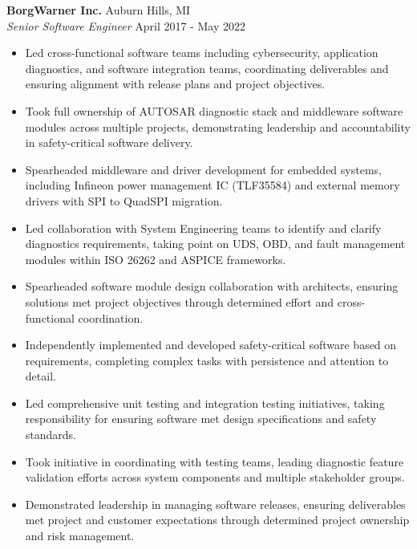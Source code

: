 \vspace{0.75em}

\noindent
\textbf{BorgWarner Inc.} \hfill Auburn Hills, MI \\
\textit{Senior Software Engineer} \hfill April 2017 - May 2022 \\
\begin{itemize}[leftmargin=*,noitemsep,topsep=3pt]
    \item Led cross-functional software teams including cybersecurity, application diagnostics, and software integration teams, coordinating deliverables and ensuring alignment with release plans and project objectives.
    \item Took full ownership of AUTOSAR diagnostic stack and middleware software modules across multiple projects, demonstrating leadership and accountability in safety-critical software delivery.
    \item Spearheaded middleware and driver development for embedded systems, including Infineon power management IC (TLF35584) and external memory drivers with SPI to QuadSPI migration.
    \item Led collaboration with System Engineering teams to identify and clarify diagnostics requirements, taking point on UDS, OBD, and fault management modules within ISO 26262 and ASPICE frameworks.
    \item Spearheaded software module design collaboration with architects, ensuring solutions met project objectives through determined effort and cross-functional coordination.
    \item Independently implemented and developed safety-critical software based on requirements, completing complex tasks with persistence and attention to detail.
    \item Led comprehensive unit testing and integration testing initiatives, taking responsibility for ensuring software met design specifications and safety standards.
    \item Took initiative in coordinating with testing teams, leading diagnostic feature validation efforts across system components and multiple stakeholder groups.
    \item Demonstrated leadership in managing software releases, ensuring deliverables met project and customer expectations through determined project ownership and risk management.
\end{itemize}

\vspace{0.5em}

